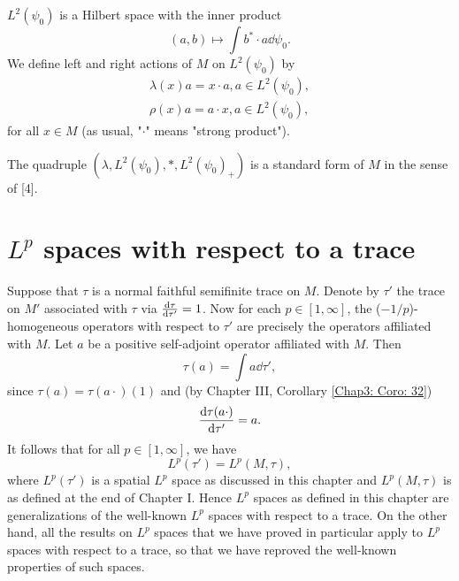 \begin{proposition}
    $L^2(\psi_0)$ is a Hilbert space with the inner product
    \[
        (a,b)\mapsto \int b^*\cdot a\dd \psi_0.
    \]
    We define left and right actions of $M$ on $L^2(\psi_0)$ by
    \[
        \begin{split}
            \lambda(x)a=x\cdot a,a\in L^2(\psi_0),\\
            \rho(x)a=a\cdot x,a\in L^2(\psi_0),
        \end{split}
    \]
    for all $x\in M$ (as usual, "$\cdot$" means "strong product").
\end{proposition}
\begin{proposition}
    The quadruple $(\lambda,L^2(\psi_0),*,L^2(\psi_0)_+)$ is a standard form of $M$ in the sense of [4].
\end{proposition}
\section{$L^p$ spaces with respect to a trace}
Suppose that $\tau$ is a normal faithful semifinite trace on $M$. Denote by $\tau'$ the trace on $M'$ associated with $\tau$ via $\dv{\tau}{\tau'}= 1$. Now for each $p\in [1,\infty]$, the ($-1/p$)-homogeneous operators with respect to $\tau'$ are precisely the operators affiliated with $M$. Let $a$ be a positive self-adjoint operator affiliated with $M$. Then
\begin{equation}
    \tau(a)=\int a\dd \tau',
\end{equation}
since $\tau(a)=\tau(a\cdot)(1)$ and (by Chapter III, Corollary \ref{Chap3: Coro: 32})
\begin{equation}
    \dv{\tau(a\cdot)}{\tau'}=a.
\end{equation}
It follows that for all $p\in[1,\infty]$, we have
\begin{equation}
    L^p(\tau')=L^p(M,\tau),
\end{equation}
where $L^p(\tau')$ is a spatial $L^p$ space as discussed in this chapter and $L^p(M,\tau)$ is as defined at the end of Chapter I. Hence $L^p$ spaces as defined in this chapter are generalizations of the well-known $L^p$ spaces with respect to a trace. On the other hand, all the results on $L^p$ spaces that we have proved in particular apply to $L^p$ spaces with respect to a trace, so that we have reproved the well-known properties of such spaces.
